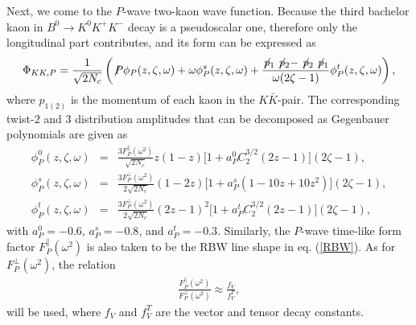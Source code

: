 \documentclass[11pt]{article}
\begin{document}
Next, we come to the $P$-wave two-kaon wave function. Because the third bachelor kaon in $B^0\to K^0 K^+K^-$ decay is a pseudoscalar one, therefore only the longitudinal part contributes, and its form can be expressed as
\begin{eqnarray}
\Phi_{KK,P}=\frac{1}{\sqrt{2N_c}}\left(\not \! P\phi_P(z,\zeta,\omega)+\omega\phi_P^s(z,\zeta,\omega)
+\frac{\not \!p_1\not \!p_2-\not \!p_2\not \!p_1}{\omega(2\zeta-1)}\phi_P^t(z,\zeta,\omega)\right),
\end{eqnarray}
where $p_{1(2)}$ is the momentum of each kaon in the $K\bar K$-pair. The corresponding twist-2 and 3 distribution amplitudes that can be decomposed as Gegenbauer polynomials are given as
\begin{eqnarray}
\phi_P^0(z,\zeta,\omega)&=&\frac{3F_P^{\parallel}(\omega^2)}{\sqrt{2N_c}}z(1-z)\Big[1+a_P^0C_2^{3/2}(2z-1)\Big](2\zeta-1),\\
\phi_P^s(z,\zeta,\omega)&=&\frac{3F_P^{\perp}(\omega^2)}{2\sqrt{2N_c}}(1-2z)\Big[1+a_P^s(1-10z+10z^2)\Big](2\zeta-1),\\
\phi_P^t(z,\zeta,\omega)&=&\frac{3F_P^{\perp}(\omega^2)}{2\sqrt{2N_c}}(2z-1)^2\Big[1+a_P^tC_2^{3/2}(2z-1)\Big](2\zeta-1),
\end{eqnarray}
with $a_P^0=-0.6$, $a_P^s=-0.8$, and $a_P^t=-0.3$. Similarly, the $P$-wave time-like form factor $F_P^{\parallel}(\omega^2)$ is also taken to be the RBW line shape in eq. (\ref{RBW}). As for  $F_P^{\perp}(\omega^2)$, the relation \cite{Wang:2016rlo}
 \begin{eqnarray}
  \frac{F_P^{\parallel}(\omega^2)}{F_P^{\perp}(\omega^2)}\approx \frac{f_V}{f_V^T},
 \label{perp}
 \end{eqnarray}
will be used, where $f_V$ and $f_V^T$ are the vector and tensor decay constants.
\end{document}

